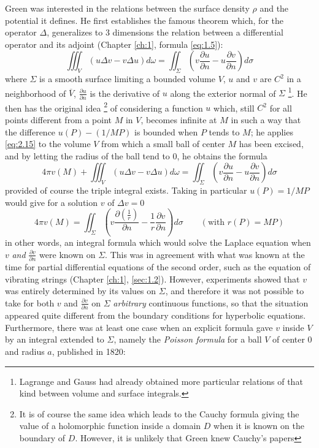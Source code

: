 \documentclass[12pt,a4paper,leqno,twoside]{extbook}
\newcommand{\pder}[2]{\frac{\partial #1}{\partial #2}}
\begin{document}
Green was interested in the relations between the surface density \(\rho\) and the potential it defines. He first establishes the famous theorem which, for the operator \(\Delta\), generalizes to 3 dimensions the relation between a differential operator and its adjoint (Chapter \ref{ch:1}, formula \eqref{eq:1.5}):
\begin{equation}
    \label{eq:2.15}
    \iiint_V \left( u\Delta v - v\Delta u \right) d\omega = \iint_\Sigma \left( v\pder{u}{n} - u\pder{v}{n} \right) d\sigma
\end{equation}
where \(\Sigma\) is a smooth surface limiting a bounded volume \(V\), \(u\) and \(v\) are \(C^2\) in a neighborhood of \(\overline{V}\), \(\pder{u}{n}\) is the derivative of \(u\) along the exterior normal of \(\Sigma\) \footnote{Lagrange \cite[vol.~I, p.~263]{135} and Gauss \cite[vol.~V, p.~22]{082} had already obtained more particular relations of that kind between volume and surface integrals.}. He then has the original idea \footnote{It is of course the same idea which leads to the Cauchy formula giving the value of a holomorphic function inside a domain \(D\) when it is known on the boundary of \(D\). However, it is unlikely that Green knew Cauchy's papers} of considering a function \(u\) which, still \(C^2\) for all points different from a point \(M\) in \(V\), becomes infinite at \(M\) in such a way that the difference \(u(P) - (1/MP)\) is bounded when \(P\) tends to \(M\); he applies \eqref{eq:2.15} to the volume \(V\) from which a small ball of center \(M\) has been excised, and by letting the radius of the ball tend to 0, he obtains the formula
\begin{equation}
    \label{eq:2.16}
    4\pi v(M) + \iiint_V \left( u\Delta v - v\Delta u \right) d\omega = \iint_\Sigma \left( v \pder{u}{n} - u \pder{v}{n} \right) d\sigma
\end{equation}
provided of course the triple integral exists. Taking in particular \(u(P) = 1/MP\) would give for a solution \(v\) of \(\Delta v = 0\)
\begin{equation}
    \label{eq:2.17}
    4\pi v(M) = \iint_\Sigma \left( v \pder{\left(\frac{1}{r}\right)}{n} - \frac{1}{r} \pder{v}{n} \right) d\sigma \qquad (\text{with } r(P)=MP)
\end{equation}
in other words, an integral formula which would solve the Laplace equation when \(v\) \emph{and} \(\pder{v}{n}\) were known on \(\Sigma\). This was in agreement with what was known at the time for partial differential equations of the second order, such as the equation of vibrating strings (Chapter \ref{ch:1}, \ref{sec:1.2}). However, experiments showed that \(v\) was entirely determined by its values on \(\Sigma\), and therefore it was not possible to take for both \(v\) and \(\pder{v}{n}\) on \(\Sigma\) \emph{arbitrary} continuous functions, so that the situation appeared quite different from the boundary conditions for hyperbolic equations. Furthermore, there was at least one case when an explicit formula gave \(v\) inside \(V\) by an integral extended to \(\Sigma\), namely the \emph{Poisson formula} for a ball \(V\) of center 0 and radius \(a\), published in 1820:
\end{document}
